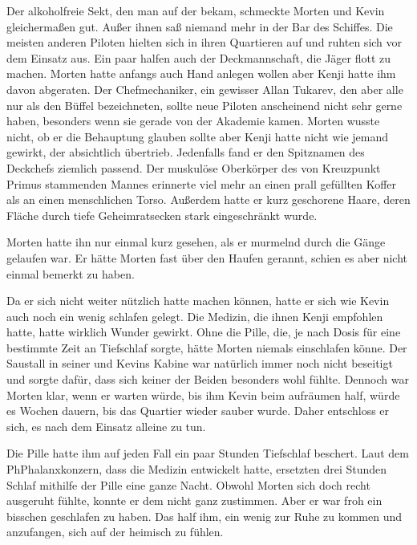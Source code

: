 Der alkoholfreie Sekt, den man auf der  bekam, schmeckte Morten und Kevin gleichermaßen gut. Außer ihnen saß niemand mehr in der Bar des Schiffes. Die meisten anderen Piloten hielten sich in ihren Quartieren auf und ruhten sich vor dem Einsatz aus. Ein paar halfen auch der Deckmannschaft, die Jäger flott zu machen. Morten hatte anfangs auch Hand anlegen wollen aber Kenji hatte ihm davon abgeraten. Der Chefmechaniker, ein gewisser Allan Tukarev, den aber alle nur als den Büffel bezeichneten, sollte neue Piloten anscheinend nicht sehr gerne haben, besonders wenn sie gerade von der Akademie kamen. Morten wusste nicht, ob er die Behauptung glauben sollte aber Kenji hatte nicht wie jemand gewirkt, der absichtlich übertrieb. Jedenfalls fand er den Spitznamen des Deckchefs ziemlich passend. Der muskulöse Oberkörper des von Kreuzpunkt Primus stammenden Mannes erinnerte viel mehr an einen prall gefüllten Koffer als an einen menschlichen Torso. Außerdem hatte er kurz geschorene Haare, deren Fläche durch tiefe Geheimratsecken stark eingeschränkt wurde.

\par

Morten hatte ihn nur einmal kurz gesehen, als er murmelnd durch die Gänge gelaufen war. Er hätte Morten fast über den Haufen gerannt, schien es aber nicht einmal bemerkt zu haben.

\par

Da er sich nicht weiter nützlich hatte machen können, hatte er sich wie Kevin auch noch ein wenig schlafen gelegt. Die Medizin, die ihnen Kenji empfohlen hatte, hatte wirklich Wunder gewirkt. Ohne die Pille, die, je nach Dosis für eine bestimmte Zeit an Tiefschlaf sorgte, hätte Morten niemals einschlafen könne. Der Saustall in seiner und Kevins Kabine war natürlich immer noch nicht beseitigt und sorgte dafür, dass sich keiner der Beiden besonders wohl fühlte. Dennoch war Morten klar, wenn er warten würde, bis ihm Kevin beim aufräumen half, würde es Wochen dauern, bis das Quartier wieder sauber wurde. Daher entschloss er sich, es nach dem Einsatz alleine zu tun.

\par

Die Pille hatte ihm auf jeden Fall ein paar Stunden Tiefschlaf beschert. Laut dem PhPhalanxkonzern, dass die Medizin entwickelt hatte, ersetzten drei Stunden Schlaf mithilfe der Pille eine ganze Nacht. Obwohl Morten sich doch recht ausgeruht fühlte, konnte er dem nicht ganz zustimmen. Aber er war froh ein bisschen geschlafen zu haben. Das half ihm, ein wenig zur Ruhe zu kommen und anzufangen, sich auf der  heimisch zu fühlen.

